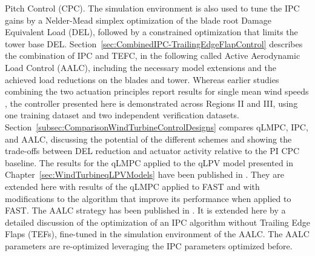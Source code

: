 Pitch Control (CPC). The simulation environment is also used to tune the IPC gains by a Nelder-Mead simplex optimization of the blade root Damage Equivalent Load (DEL), followed by
a constrained optimization that limits the tower base DEL.
%
Section~\ref{sec:CombinedIPC-TrailingEdgeFlapControl} describes the combination of IPC and TEFC, in the following called Active Aerodynamic Load Control (AALC), including the necessary model extensions and the achieved load reductions on the blades and tower. Whereas earlier studies combining the two actuation principles report results for single mean wind
speeds \cite{wilson2009combined, henriksen2013model, he2018combined}, the controller presented
here is demonstrated across Regions II and III, using one training dataset and two independent
verification datasets.
%
Section~\ref{subsec:ComparisonWindTurbineControlDesigns} compares qLMPC, IPC, and AALC, discussing the potential of the different schemes and showing the trade-offs between DEL reduction and actuator activity relative to the PI CPC
baseline. 
The results for the qLMPC applied to the qLPV model presented in Chapter~\ref{sec:WindTurbineqLPVModels} have been published in \cite{dittmer2021velocity}. They are extended here with results of the qLMPC applied to FAST and with modifications to the algorithm that improve its performance when applied to FAST. The AALC strategy has been published in \cite{dittmer2024combined}. It is extended here by a detailed discussion of the optimization of an IPC algorithm without Trailing Edge Flaps (TEFs), fine-tuned in the simulation environment of the AALC. The AALC parameters are re-optimized leveraging the IPC parameters optimized before.



